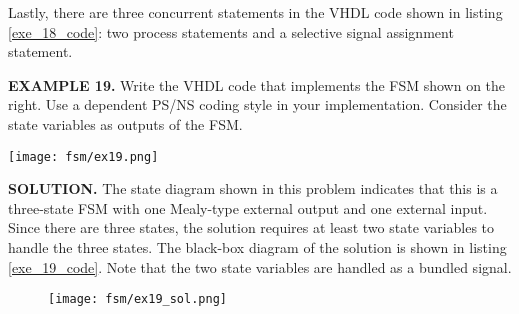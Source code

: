 Lastly, there are three concurrent statements in the VHDL code shown in listing \ref{exe_18_code}: two process statements and a selective signal assignment statement. 

\begin{leftbar}
\begin{minipage}[t]{0.5\textwidth}
\vspace{10pt}
\noindent
\textbf{EXAMPLE 19.}
Write the VHDL code that implements the FSM shown on the right. Use a dependent PS/NS coding style in your implementation. Consider the state variables as outputs of the FSM.
\end{minipage}
\begin{minipage}[t]{0.47\textwidth}
\vspace{0pt}\raggedright
\centering
\texttt{[image: fsm/ex19.png]}
\end{minipage}
\end{leftbar}
\noindent
\textbf{SOLUTION.} The state diagram shown in this problem indicates that this is a three-state FSM with one Mealy-type external output and one external input. Since there are three states, the solution requires at least two state variables to handle the three states. The black-box diagram of the solution is shown in listing \ref{exe_19_code}. Note that the two state variables are handled as a bundled signal.


\begin{figure}[!h]
    \centering
	\texttt{[image: fsm/ex19\_sol.png]}
\end{figure}

